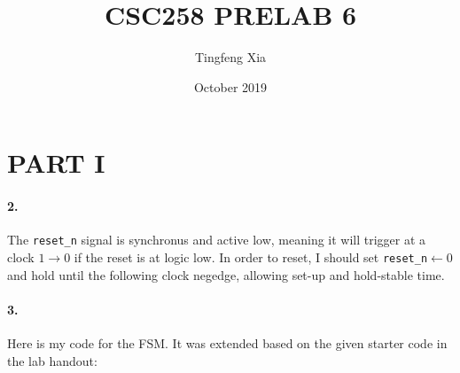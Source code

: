 \documentclass{article}
\title{CSC258 PRELAB 6}
\author{Tingfeng Xia}
\date{October 2019}
\begin{document}
\maketitle
\section*{PART I}
\paragraph{2.} The \texttt{reset\_n} signal is synchronus and active low, meaning it will trigger at a clock $1\rightarrow 0$ if the reset is at logic low. In order to reset, I should set \texttt{reset\_n}$\gets 0$ and hold until the following clock negedge, allowing set-up and hold-stable time.
\paragraph{3.} Here is my code for the FSM. It was extended based on the given starter code in the lab handout:
\end{document}
